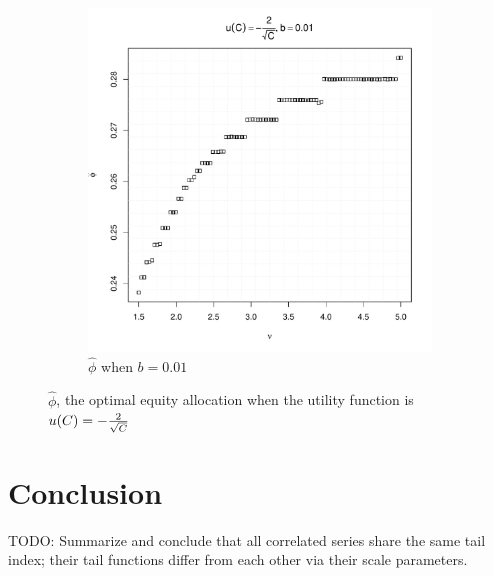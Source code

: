 \documentclass{article}
\newcommand{\1}[1]{
  \mathbf{1}_{\{#1\}}
}
\begin{document}
\begin{figure}[htb!]
\begin{subfigure}[b]{0.5\linewidth}
    \includegraphics[width=\textwidth]{phi_hat_b_t5e-1.pdf}
    \caption{$\hat\phi$ when $b = 0.01$}
    \label{fig:phi_hat_b_t5e-1}
  \end{subfigure}
  \caption{$\hat\phi$, the optimal equity allocation when the utility
    function is $u(C) = -{2 \over \sqrt{C}}$
  }
\end{figure}


\section{Conclusion}
TODO: Summarize and conclude that all correlated series share the same
tail index; their tail functions differ from each other via their
scale parameters.
\end{document}
